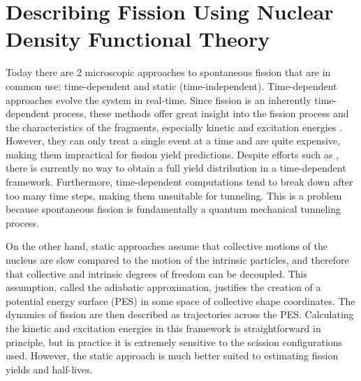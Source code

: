\chapter{Describing Fission Using Nuclear Density Functional Theory}\label{chap:Model}


Today there are 2 microscopic approaches to spontaneous fission that are in common use: time-dependent and static (time-independent). Time-dependent approaches evolve the system in real-time. Since fission is an inherently time-dependent process, these methods offer great insight into the fission process and the characteristics of the fragments, especially kinetic and excitation energies \cite{Scamps2018, Scamps2015a, Simenel2014, Grineviciute2018, Umar2010}. However, they can only treat a single event at a time and are quite expensive, making them impractical for fission yield predictions. Despite efforts such as \cite{Scamps2015, Bulgac2018}, there is currently no way to obtain a full yield distribution in a time-dependent framework. Furthermore, time-dependent computations tend to break down after too many time steps, making them unsuitable for tunneling. This is a problem because spontaneous fission is fundamentally a quantum mechanical tunneling process.

On the other hand, static approaches assume that collective motions of the nucleus are slow compared to the motion of the intrinsic particles, and therefore that collective and intrinsic degrees of freedom can be decoupled. This assumption, called the adiabatic approximation, justifies the creation of a potential energy surface (PES) in some space of collective shape coordinates. The dynamics of fission are then described as trajectories across the PES. Calculating the kinetic and excitation energies in this framework is straightforward in principle, but in practice it is extremely sensitive to the scission configurations used. However, the static approach is much better suited to estimating fission yields and half-lives.


